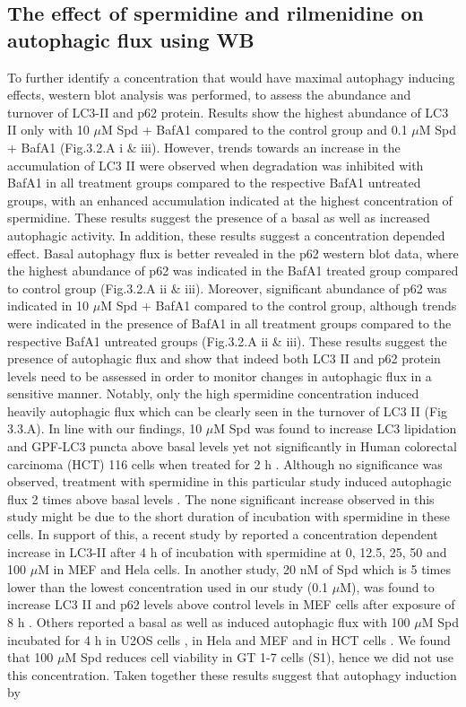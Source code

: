 {%

\subsection{The effect of spermidine and rilmenidine on autophagic flux using WB}

To further identify a concentration that would have maximal autophagy inducing effects, western blot analysis was performed, to assess the abundance and turnover of LC3-II and p62 protein. Results show the highest abundance of LC3 II only with 10 $\mu$M Spd + BafA1 compared to the control group and 0.1 $\mu$M Spd + BafA1 (Fig.3.2.A i \& iii). However, trends towards an increase in the accumulation of LC3 II were observed when degradation was inhibited with BafA1 in all treatment groups compared to the respective BafA1 untreated groups, with an enhanced accumulation indicated at the highest concentration of spermidine. These results suggest the presence of a basal as well as increased autophagic activity. In addition, these results suggest a concentration depended effect. Basal autophagy flux is better revealed in the p62 western blot data, where the highest abundance of p62 was indicated in the BafA1 treated group compared to control group (Fig.3.2.A ii \& iii). Moreover, significant abundance of p62 was indicated in 10 $\mu$M Spd + BafA1 compared to the control group, although trends were indicated in the presence of BafA1 in all treatment groups compared to the respective BafA1 untreated groups (Fig.3.2.A ii \& iii). These results suggest the presence of autophagic flux and show that indeed both LC3 II and p62 protein levels need to be assessed in order to monitor changes in autophagic flux in a sensitive manner. Notably, only the high spermidine concentration induced heavily autophagic flux which can be clearly seen in the turnover of LC3 II (Fig 3.3.A). In line with our findings, 10 $\mu$M Spd was found to increase LC3 lipidation and GPF-LC3 puncta above  basal levels yet not significantly in Human colorectal carcinoma (HCT) 116 cells when treated for 2 h \citep{Morselli2011}. Although no significance was observed, treatment with spermidine in this particular study induced autophagic flux 2 times above basal levels \citep{Morselli2011}. The none significant increase observed in this study might be due to the short duration of incubation with spermidine in these cells. In support of this, a recent study by \citet{Yue2017} reported a concentration dependent increase in LC3-II after 4 h of incubation with spermidine at  0, 12.5, 25, 50 and 100 $\mu$M in MEF and Hela cells.  In another study, 20 nM of Spd which is 5 times lower than the lowest concentration used in our study (0.1 $\mu$M), was found to increase LC3 II and p62 levels above control levels in MEF cells after exposure of 8 h \citep{DuToit2018a}. Others reported a basal as well as induced autophagic flux with 100 $\mu$M Spd incubated for 4 h in U2OS cells  \citep{Pietrocola2015}, in Hela and MEF \citep{Yue2017} and in HCT cells \citep{Morselli2011}. We found that 100 $\mu$M Spd reduces cell viability in GT 1-7 cells (S1), hence we did not use this concentration. Taken together these results suggest that autophagy induction by }
